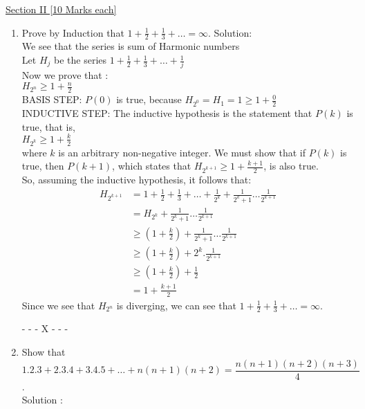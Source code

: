 \documentclass{article}
\begin{document}
\underline{\large{Section II \hspace*{7cm} [10 Marks each]}}
\begin{enumerate} 
 \item Prove by Induction that $1+\frac{1}{2}+\frac{1}{3}+\dots=\infty$.
 \newline
Solution: \\
We see that the series is sum of Harmonic numbers\\
Let $H_{j}$ be the series $1+\frac{1}{2}+\frac{1}{3}+\dots+ \frac{1}{j}$\\
Now we prove that :\\
$H_{2^n} \geq 1 + \frac{n}{2}$\\
BASIS STEP: $P(0)$ is true, because $H_{2^0} = H_1 = 1 ≥ 1 + \frac{0}{2}$ \\
INDUCTIVE STEP: The inductive hypothesis is the statement that $P(k)$ is true, that is,\\
$H_{2^k} \geq 1 + \frac{k}{2}$ \\
where $k$ is an arbitrary non-negative integer. We must show that if $P(k)$ is true, then $P(k + 1)$, which states that $H_{2^{k+1}} \geq 1 + \frac{k+1}{2}$, is also true.\\
So, assuming the inductive hypothesis, it follows that:
\begin{align*}
H_{2^{k+1}} &=  1+\frac{1}{2}+\frac{1}{3}+\dots + \frac{1}{2^k}+  \frac{1}{2^k +1} \dots \frac{1}{2^{k+1}}\\
&= H_{2^k} + \frac{1}{2^k +1} \dots \frac{1}{2^{k+1}}\\
&\geq \left( 1+ \frac{k}{2}\right) +  \frac{1}{2^k +1} \dots \frac{1}{2^{k+1}}\\
& \geq \left( 1+ \frac{k}{2}\right) + 2^k.\frac{1}{2^{k+1}}\\
& \geq \left( 1+ \frac{k}{2}\right) + \frac{1}{2}\\
& = 1 + \frac{k+1}{2}
\end{align*}
Since we see that $H_{2^n}$ is diverging, we can see that  $1+\frac{1}{2}+\frac{1}{3}+\dots=\infty$. 




\begin{center}
- - - X - - -
\end{center}
 
 \item Show that $$1.2.3+2.3.4+3.4.5+\dots +n(n+1)(n+2)= \frac{n(n+1)(n+2)(n+3)}{4}$$. \\
 Solution : \\
 

\end{enumerate}
\end{document}
